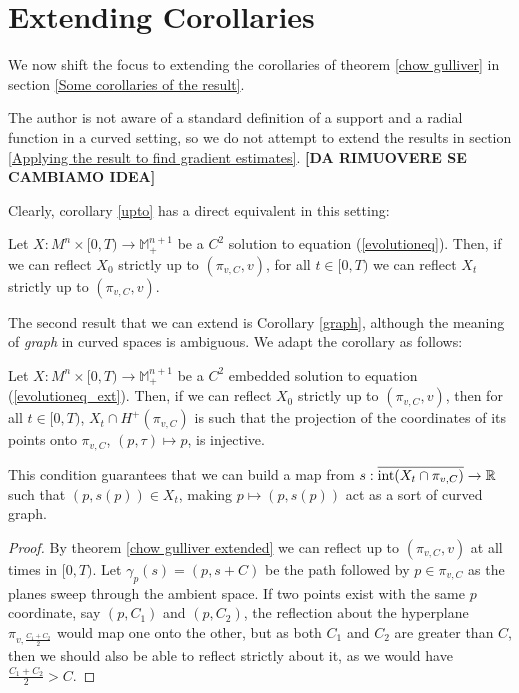 \section{Extending Corollaries}

We now shift the focus to extending the corollaries of theorem \ref{chow gulliver} in section \ref{Some corollaries of the result}. 

The author is not aware of a standard definition of a support and a radial function in a curved setting, so we do not attempt to extend the results in section \ref{Applying the result to find gradient estimates}. { \textbf{[DA RIMUOVERE SE CAMBIAMO IDEA]}}

Clearly, corollary \ref{upto} has a direct equivalent in this setting:
\begin{cor}
	Let $X:M^n\times [0,T) \rightarrow \mathbb{M}^{n+1}_+$ be a $C^2$ solution to equation (\ref{evolutioneq}). Then, if we can reflect $X_0$ strictly up to $(\pi_{v,C},v)$, for all $t\in [0,T)$ we can reflect $X_t$ strictly up to $(\pi_{v,C},v)$.  
\end{cor}

The second result that we can extend is Corollary \ref{graph}, although the meaning of \textit{graph} in curved spaces is ambiguous. We adapt the corollary as follows: 


\begin{cor}
	Let $X:M^n\times [0,T) \rightarrow \mathbb{M}^{n+1}_+$ be a $C^2$ embedded solution to equation (\ref{evolutioneq_ext}). Then, if we can reflect $X_0$ strictly up to $(\pi_{v,C},v)$, then for all $t\in [0,T)$, $X_t \cap H^+(\pi_{v,C})$ is such that the projection of the coordinates of its points onto $\pi_{v,C}$, $(p, \tau)\mapsto p$, is injective. 
\end{cor}
This condition guarantees that we can build a map from $s:\overline{\mathrm{int}(X_t \cap \pi_{v,C})}\rightarrow \mathbb{R}$ such that $(p, s(p))\in X_t$, making $p\mapsto (p, s(p))$ act as a sort of curved graph. 
\begin{proof}
	By  theorem \ref{chow gulliver extended} we can reflect up to $(\pi_{v,C},v)$ at all times in $[0,T)$. Let $\gamma_p(s)=(p, s+C)$ be the path followed by $p\in \pi_{v,C}$ as the planes sweep through the ambient space. If two points exist with the same $p$ coordinate, say $(p, C_1)$ and $(p, C_2)$, the reflection about the hyperplane $\pi_{v,\frac{ C_1 +  C_2}{2}}$ would map one onto the other, but as both $C_1$ and $C_2$ are greater than $C$, then we should also be able to reflect strictly about it, as we would have $\frac{ C_1 +  C_2}{2}>C$. 
\end{proof}

